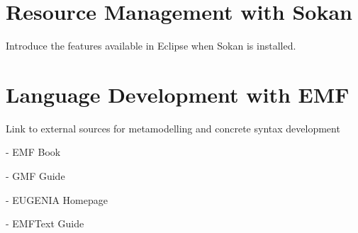 \section{Resource Management with Sokan}

Introduce the features available in Eclipse when Sokan is installed.

\section{Language Development with EMF}

Link to external sources for metamodelling and concrete syntax development

- EMF Book

- GMF Guide

- EUGENIA Homepage

- EMFText Guide